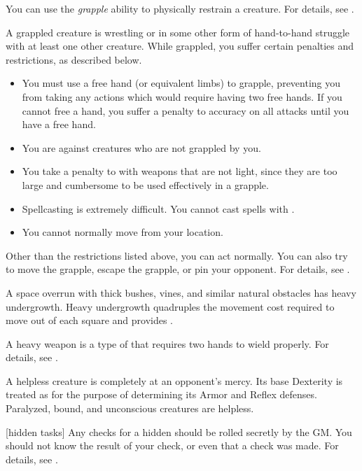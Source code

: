  You can use the \textit{grapple} ability to physically restrain a creature.
For details, see .

 A grappled creature is wrestling or in some other form of hand-to-hand struggle with at least one other creature.
While grappled, you suffer certain penalties and restrictions, as described below.
\begin{itemize}
    \item You must use a free hand (or equivalent limbs) to grapple, preventing you from taking any actions which would require having two free hands.
        If you cannot free a hand, you suffer a  penalty to accuracy on all  attacks until you have a free hand.
    \item You are  against creatures who are not grappled by you.
    \item You take a  penalty to  with weapons that are not light, since they are too large and cumbersome to be used effectively in a grapple.
    \item Spellcasting is extremely difficult. You cannot cast spells with .
    \item You cannot normally move from your location. 
\end{itemize}

Other than the restrictions listed above, you can act normally. You can also try to move the grapple, escape the grapple, or pin your opponent. For details, see .

 A space overrun with thick bushes, vines, and similar natural obstacles has heavy undergrowth.
Heavy undergrowth quadruples the movement cost required to move out of each square and provides .

 A heavy weapon is a type of  that requires two hands to wield properly.
For details, see .

 A helpless creature is completely at an opponent's mercy.
Its base Dexterity is treated as  for the purpose of determining its Armor and Reflex defenses.
Paralyzed, bound, and unconscious creatures are helpless.

[hidden tasks] Any checks for a hidden  should be rolled secretly by the GM.\@
You should not know the result of your check, or even that a check was made.
For details, see .

